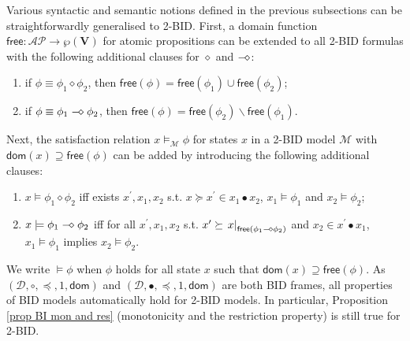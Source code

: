 \documentclass[conference,compsoc, 10pt]{IEEEtran}
\newcommand {\cD } {{\mathcal{D}}}
\newcommand {\cM } {{\mathcal{M}}}
\newcommand {\LTypeEs } {{\mathsf{dom}}}
\newcommand {\LTypeE }[1] {{\mathsf{dom}\!\left(#1\right)}}
\newcommand {\LTypeFs } {{\mathsf{free}}}
\newcommand {\LTypeF }[1] {{\mathsf{free}{\left(#1\right)}}}
\newcommand {\rt }[2] {{\left.{#1}\right|_{#2}}}
\newcommand {\vars } {\mathbf{V}}
\newcommand {\AP} {{\mathcal{AP}}}
\newcommand{\sd}{\diamond}%
\newcommand {\sdimp} {\mathrel{-\mkern-2.5mu\diamond}}
\begin{document}
\begin{appendices}
		Various syntactic and semantic notions defined in the previous subsections can be straightforwardly generalised to 2-BID. First, a domain function $\LTypeFs: \AP \rightarrow \wp(\vars)$ for atomic propositions can be extended to all 2-BID formulas with the following additional clauses for $\sd$ and $\sdimp$:
		\begin{enumerate}
			\item if $\phi\equiv \phi_1\sd\phi_2$, then $\LTypeF{\phi} = \LTypeF{\phi_1}\cup \LTypeF{\phi_2}$;
			\item if $\phi\equiv \phi_1\sdimp\phi_2$, then $\LTypeF{\phi} = \LTypeF{\phi_2}\backslash\LTypeF{\phi_1}$.
		\end{enumerate}
		Next, the satisfaction relation $x\models_\cM\phi$ for states $x$ in a 2-BID model $\cM$ with $\LTypeE{x}\supseteq\LTypeF{\phi}$ can be added by introducing the following additional clauses:
		\begin{enumerate}
			\item $x\models \phi_1\sd\phi_2$ iff exists $x^\prime,x_1,x_2$ s.t. $x\succeq x^\prime\in x_1\bullet x_2$, $x_1\models \phi_1$ and $x_2\models\phi_2$;
			\item $x\models \phi_1\sdimp\phi_2$ iff for all $x^\prime,x_1,x_2$ s.t. $x^\prime\succeq \rt{x}{\LTypeF{\phi_1\sdimp\phi_2}}$ and $x_2\in x^\prime\bullet x_1$, $x_1\models \phi_1$ implies $x_2\models \phi_2$.
		\end{enumerate}
		We write $\models\phi$ when $\phi$ holds for all state $x$ such that $\LTypeE{x}\supseteq\LTypeF{\phi}$. As $(\cD,\circ,\preceq,1,\LTypeEs)$ and $(\cD,\bullet,\preceq,1,\LTypeEs)$ are both BID frames, all properties of BID models automatically hold for 2-BID models. In particular, Proposition \ref{prop BI mon and res} (monotonicity and the restriction property) is still true for 2-BID.
		

\end{appendices}
\end{document}
